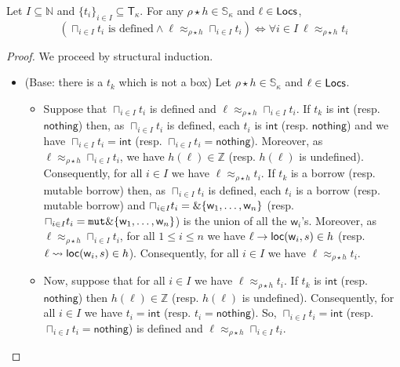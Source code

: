 \begin{lemma}\label{lem:co-additive-type}
  Let $I\subseteq\mathbb{N}$ and $\{t_i\}_{i\in I}\subseteq\mathsf{T}_\kappa$.
  For any $\rho\star h\in\mathbb{S}_\kappa$ and $\ell\in\mathsf{Locs}$,
  \[(\sqcap_{i\in I}t_i \text{ is defined} \land
  \ell\approx_{\rho\star h}\sqcap_{i\in I}t_i)
  \iff \forall i\in I\ \ell\approx_{\rho\star h}t_i\]
\end{lemma}
\begin{proof}
  We proceed by structural induction.
  \begin{itemize}
    \item (Base: there is a $t_k$ which is not a box)
    Let $\rho\star h\in\mathbb{S}_\kappa$ and $\ell\in\mathsf{Locs}$.
    \begin{itemize}
      \item Suppose that $\sqcap_{i\in I}t_i$ is defined and
      $\ell\approx_{\rho\star h}\sqcap_{i\in I}t_i$.
      If $t_k$ is $\mathsf{int}$ (resp. $\mathsf{nothing}$) then,
      as $\sqcap_{i\in I}t_i$ is defined, each $t_i$ is $\mathsf{int}$
      (resp. $\mathsf{nothing}$) and we have $\sqcap_{i\in I}t_i=\mathsf{int}$
      (resp. $\sqcap_{i\in I}t_i=\mathsf{nothing}$).
      Moreover, as $\ell\approx_{\rho\star h}\sqcap_{i\in I}t_i$, we have
      $h(\ell)\in\mathbb{Z}$ (resp. $h(\ell)$ is undefined). Consequently,
      for all $i\in I$ we have $\ell\approx_{\rho\star h}t_i$.
      If $t_k$ is a borrow (resp. mutable borrow) then, as $\sqcap_{i\in I}t_i$
      is defined, each $t_i$ is a borrow (resp. mutable borrow) and
      $\sqcap_{i\in I}t_i=\&\{\mathsf{w}_1,\ldots,\mathsf{w}_n\}$
      (resp. $\sqcap_{i\in I}t_i=\mathtt{mut}\&\{\mathsf{w}_1,\ldots,\mathsf{w}_n\}$)
      is the union of all the $\mathsf{w}_i$'s. Moreover, as
      $\ell\approx_{\rho\star h}\sqcap_{i\in I}t_i$, for all $1\le i\le n$
      we have $\ell\to\mathsf{loc}(\mathsf{w}_i,s)\in h$
      (resp. $\ell\leadsto\mathsf{loc}(\mathsf{w}_i,s)\in h$). Consequently,
      for all $i\in I$ we have $\ell\approx_{\rho\star h}t_i$.
      \item Now, suppose that for all $i\in I$ we have $\ell\approx_{\rho\star h}t_i$.
      If $t_k$ is $\mathsf{int}$ (resp. $\mathsf{nothing}$) then
      $h(\ell)\in\mathbb{Z}$ (resp. $h(\ell)$ is undefined). Consequently,
      for all $i\in I$ we have $t_i = \mathsf{int}$ (resp. $t_i = \mathsf{nothing}$).
      So, $\sqcap_{i\in I}t_i = \mathsf{int}$
      (resp. $\sqcap_{i\in I}t_i=\mathsf{nothing}$) is defined and
      $\ell\approx_{\rho\star h}\sqcap_{i\in I}t_i$.

\end{itemize}
\end{itemize}
\end{proof}
